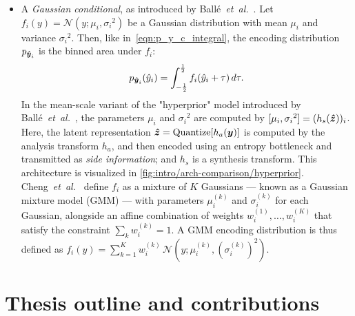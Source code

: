 \begin{itemize}
  \item
    A \emph{Gaussian conditional}, as introduced by Ballé~\emph{et~al.}~\cite{balle2018variational}.
    Let $f_i(y) = \mathcal{N}(y; {\mu_i}, {\sigma_i}^2)$ be a Gaussian distribution with mean ${\mu_i}$ and variance ${\sigma_i}^2$.
    Then, like in~\cref{eqn:p_y_c_integral}, the encoding distribution $p_{{\boldsymbol{\hat{y}}}_i}$ is the binned area under $f_i$:
    \begin{equation}
      \label{eqn:p_y_i_integral}
      p_{{\boldsymbol{\hat{y}}}_i}(\hat{y}_i)
      = \int_{-\frac{1}{2}}^{\frac{1}{2}} f_i(\hat{y}_i + \tau) \, d\tau.
    \end{equation}
    In the mean-scale variant of the "hyperprior" model introduced by Ballé~\emph{et~al.}~\cite{balle2018variational},
    the parameters ${\mu_i}$ and ${\sigma_i}^2$ are computed by
    $[{\mu_i}, {\sigma_i}^2] = (h_s({\boldsymbol{\hat{z}}}))_i$.
    Here, the latent representation ${\boldsymbol{\hat{z}}} = \operatorname{Quantize}[h_a({\boldsymbol{y}})]$ is computed by the analysis transform $h_a$, and then encoded using an entropy bottleneck and transmitted as \emph{side information};
    and $h_s$ is a synthesis transform.
    This architecture is visualized in \cref{fig:intro/arch-comparison/hyperprior}.
    Cheng~\emph{et~al.}~\cite{cheng2020learned} define $f_i$ as a mixture of $K$ Gaussians --- known as a Gaussian mixture model (GMM) --- with parameters ${\mu}_{i}^{(k)}$ and ${\sigma}_{i}^{(k)}$ for each Gaussian, alongside an affine combination of weights ${w}_{i}^{(1)}, \ldots, {w}_{i}^{(K)}$ that satisfy the constraint $\sum_k {w}_{i}^{(k)} = 1$.
    A GMM encoding distribution is thus defined as
    $f_i(y) = \sum_{k=1}^{K} {w}_{i}^{(k)} \, \mathcal{N}(y; {\mu}_{i}^{(k)}, ({\sigma}_{i}^{(k)})^2)$.
\end{itemize}




\section{Thesis outline and contributions}


